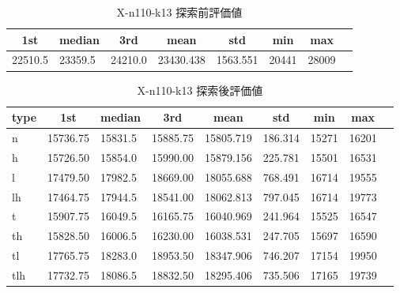 \begin{table}[htbp]
    \caption{X-n110-k13 探索前評価値}
    \begin{tabular}{|l|l|l|l|l|l|l|l|}\hline
    \multicolumn{1}{|c|}{\textbf{1st}}
    &\multicolumn{1}{c|}{\textbf{median}}
    &\multicolumn{1}{c|}{\textbf{3rd}}
    &\multicolumn{1}{c|}{\textbf{mean}}
    &\multicolumn{1}{c|}{\textbf{std}}
    &\multicolumn{1}{c|}{\textbf{min}}
    &\multicolumn{1}{c|}{\textbf{max}}\\\hline
	22510.5 & 23359.5 & 24210.0 & 23430.438 & 1563.551 & 20441 & 28009\\\hline
	\end{tabular}
\end{table}
\begin{table}[htbp]
    \caption{X-n110-k13 探索後評価値}
    \begin{tabular}{|l|l|l|l|l|l|l|l|l|}\hline
    \multicolumn{1}{|c|}{\textbf{type}}
    &\multicolumn{1}{|c|}{\textbf{1st}}
    &\multicolumn{1}{c|}{\textbf{median}}
    &\multicolumn{1}{c|}{\textbf{3rd}}
    &\multicolumn{1}{c|}{\textbf{mean}}
    &\multicolumn{1}{c|}{\textbf{std}}
    &\multicolumn{1}{c|}{\textbf{min}}
    &\multicolumn{1}{c|}{\textbf{max}}\\\hline
	n & 15736.75 & 15831.5 & 15885.75 & 15805.719 & 186.314 & 15271 & 16201\\\hline
	h & 15726.50 & 15854.0 & 15990.00 & 15879.156 & 225.781 & 15501 & 16531\\\hline
	l & 17479.50 & 17982.5 & 18669.00 & 18055.688 & 768.491 & 16714 & 19555\\\hline
	lh & 17464.75 & 17944.5 & 18541.00 & 18062.813 & 797.045 & 16714 & 19773\\\hline
	t & 15907.75 & 16049.5 & 16165.75 & 16040.969 & 241.964 & 15525 & 16547\\\hline
	th & 15828.50 & 16006.5 & 16230.00 & 16038.531 & 247.705 & 15697 & 16590\\\hline
	tl & 17765.75 & 18283.0 & 18953.50 & 18347.906 & 746.207 & 17154 & 19950\\\hline
	tlh & 17732.75 & 18086.5 & 18832.50 & 18295.406 & 735.506 & 17165 & 19739\\\hline
	\end{tabular}
\end{table}
